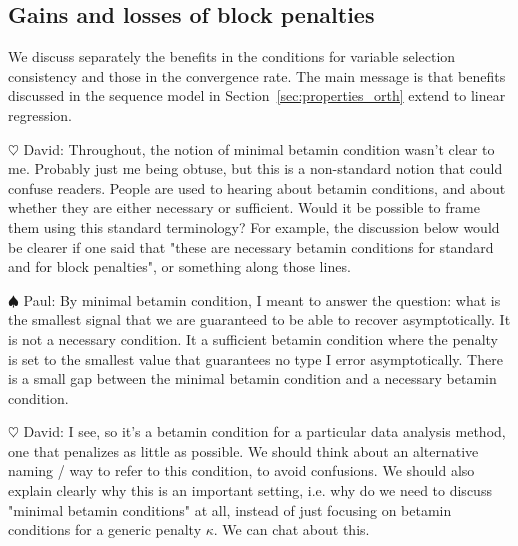 \documentclass[aos]{imsart}
\theoremstyle{plain}
\newcommand{\david}[1]{{\small{\color{blue} \sf $\heartsuit$ David: #1}}}
\newcommand{\paul}[1]{{\small{\color{green} \sf $\spadesuit$ Paul: #1}}}
\begin{document}
\subsection{Gains and losses of block penalties}
\label{ssec:regression_gains}

We discuss separately the benefits in the conditions for variable selection consistency and those in the convergence rate. The main message %
is that benefits discussed in the sequence model in Section~\ref{sec:properties_orth} extend to linear regression.
\bigskip

\david{Throughout, the notion of minimal betamin condition wasn't clear to me. Probably just me being obtuse, but this is a non-standard notion that could confuse readers. People are used to hearing about betamin conditions, and about whether they are either necessary or sufficient. Would it be possible to frame them using this standard terminology? For example, the discussion below would be clearer if one said that "these are necessary betamin conditions for standard and for block penalties", or something along those lines.}

\paul{By minimal betamin condition, I meant to answer the question: what is the smallest signal that we are guaranteed to be able to recover asymptotically. It is not a necessary condition. It a sufficient betamin condition where the penalty is set to the smallest value that guarantees no type I error asymptotically. There is a small gap between the minimal betamin condition and a necessary betamin condition.}

\david{I see, so it's a betamin condition for a particular data analysis method, one that penalizes as little as possible. We should think about an alternative naming / way to refer to this condition, to avoid confusions. We should also explain clearly why this is an important setting, i.e. why do we need to discuss "minimal betamin conditions" at all, instead of just focusing on betamin conditions for a generic penalty $\kappa$. We can chat about this.}
\end{document}
